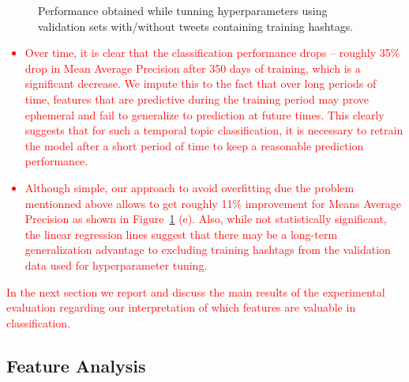 \begin{figure}[t!]
\begin{centering}
\par\end{centering}
\caption{Performance obtained while tunning hyperparameters using validation sets with/without tweets containing training hashtags.}
\label{fig:ClassifiersRobustness}
\end{figure}


\textcolor{red}{
\begin{itemize}
    \item Over time,  it is clear that the classification performance drops -- roughly 35\% drop in Mean Average Precision after 350 days of training, which is a significant decrease. We impute this  to the fact that over long periods of time, features that are predictive during the training period may  prove ephemeral and fail to generalize to prediction at future times. This clearly suggests that for such a temporal topic classification, it is necessary to retrain the model after a short period of time to keep a reasonable prediction performance.
    \item Although simple, our approach to avoid overfitting due the problem mentionned above  allows to get roughly 11\% improvement for Means Average  Precision as shown in Figure~\ref{fig:ClassifiersRobustness} (e). Also, while not statistically significant, the linear regression lines suggest that there may be a long-term generalization advantage to excluding training hashtags from the validation data used for hyperparameter tuning.
\end{itemize}
}

\textcolor{red}{In the next section we  report and discuss the main results of the experimental evaluation regarding our interpretation of which features are valuable in classification.}









\subsection*{Feature Analysis}
\label{label:featureanalysis}

